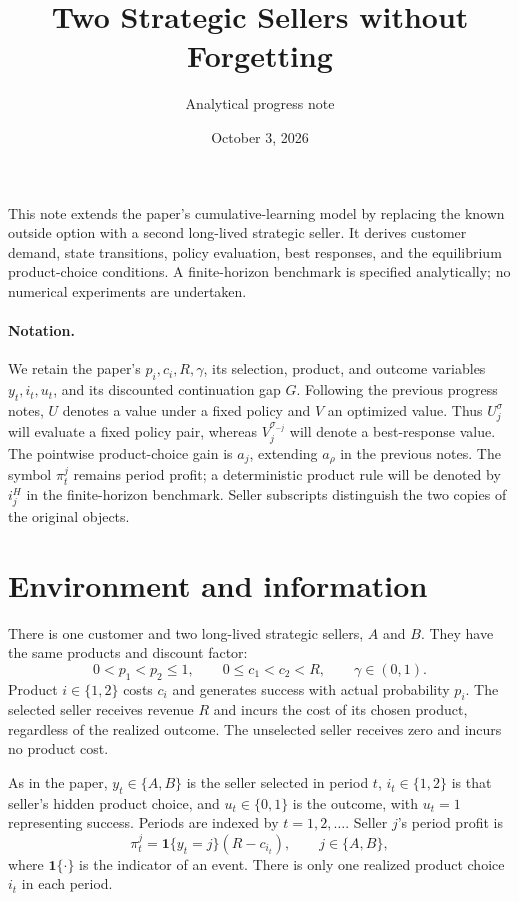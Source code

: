 \documentclass[11pt]{article}
\title{Two Strategic Sellers without Forgetting}
\author{Analytical progress note}
\date{October 3, 2026}
\newcommand{\Ind}[1]{\mathbf 1\{#1\}}
\begin{document}
\maketitle

This note extends the paper's cumulative-learning model by replacing the
known outside option with a second long-lived strategic seller. It derives
customer demand, state transitions, policy evaluation, best responses, and
the equilibrium product-choice conditions. A finite-horizon benchmark is
specified analytically; no numerical experiments are undertaken.

\paragraph{Notation.}
We retain the paper's $p_i,c_i,R,\gamma$, its selection, product, and outcome
variables $y_t,i_t,u_t$, and its discounted continuation gap $G$.
Following the previous progress notes, $U$ denotes a value under a fixed
policy and $V$ an optimized value. Thus $U_j^\sigma$ will evaluate a fixed
policy pair, whereas $V_j^{\sigma_{-j}}$ will denote a best-response value.
The pointwise product-choice gain is $a_j$, extending $a_\rho$ in the
previous notes. The symbol $\pi_t^j$ remains period profit; a deterministic
product rule will be denoted by $i_j^H$ in the finite-horizon benchmark.
Seller subscripts distinguish the two copies of the original objects.

\section{Environment and information}

There is one customer and two long-lived strategic sellers, $A$ and $B$.
They have the same products and discount factor:
\begin{equation}\label{eq:primitives}
0<p_1<p_2\leq1,\qquad 0\leq c_1<c_2<R,\qquad \gamma\in(0,1).
\end{equation}
Product $i\in\{1,2\}$ costs $c_i$ and generates success with actual
probability $p_i$. The selected seller receives revenue $R$ and incurs
the cost of its chosen product, regardless of the realized outcome.
The unselected seller receives zero and incurs no product cost.

As in the paper, $y_t\in\{A,B\}$ is the seller selected in period $t$,
$i_t\in\{1,2\}$ is that seller's hidden product choice, and
$u_t\in\{0,1\}$ is the outcome, with $u_t=1$ representing success.
Periods are indexed by $t=1,2,\ldots$. Seller $j$'s period profit is
\begin{equation}\label{eq:profit}
\pi_t^j=\Ind{y_t=j}(R-c_{i_t}),\qquad j\in\{A,B\},
\end{equation}
where $\Ind{\cdot}$ is the indicator of an event. There is only one
realized product choice $i_t$ in each period.
\end{document}
